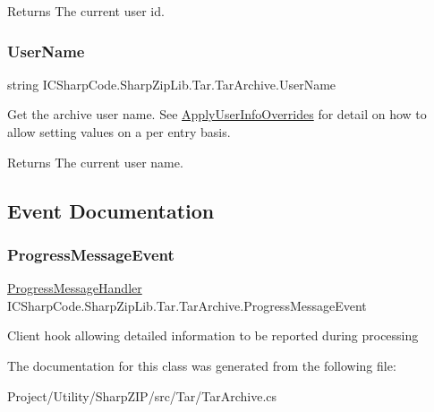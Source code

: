 \begin{DoxyReturn}{Returns}
The current user id. 
\end{DoxyReturn}
\mbox{\label{class_i_c_sharp_code_1_1_sharp_zip_lib_1_1_tar_1_1_tar_archive_a8cca385887242221e11380267a8723c5}} 
\subsubsection{\texorpdfstring{User\+Name}{UserName}}
{\footnotesize\ttfamily string I\+C\+Sharp\+Code.\+Sharp\+Zip\+Lib.\+Tar.\+Tar\+Archive.\+User\+Name\hspace{0.3cm}{\ttfamily [get]}}



Get the archive user name. See \hyperlink{class_i_c_sharp_code_1_1_sharp_zip_lib_1_1_tar_1_1_tar_archive_a94d90eb52245f63a5ad06fb0289104ff}{Apply\+User\+Info\+Overrides} for detail on how to allow setting values on a per entry basis. 

\begin{DoxyReturn}{Returns}
The current user name. 
\end{DoxyReturn}


\subsection{Event Documentation}
\mbox{\label{class_i_c_sharp_code_1_1_sharp_zip_lib_1_1_tar_1_1_tar_archive_a2471cdc0871512dd5a26250957268ad4}} 
\subsubsection{\texorpdfstring{Progress\+Message\+Event}{ProgressMessageEvent}}
{\footnotesize\ttfamily \hyperlink{namespace_i_c_sharp_code_1_1_sharp_zip_lib_1_1_tar_aceffb334332f726e9d8619ddf6e3bf96}{Progress\+Message\+Handler} I\+C\+Sharp\+Code.\+Sharp\+Zip\+Lib.\+Tar.\+Tar\+Archive.\+Progress\+Message\+Event}



Client hook allowing detailed information to be reported during processing 



The documentation for this class was generated from the following file\+:\begin{DoxyCompactItemize}
\item 
Project/\+Utility/\+Sharp\+Z\+I\+P/src/\+Tar/Tar\+Archive.\+cs\end{DoxyCompactItemize}
